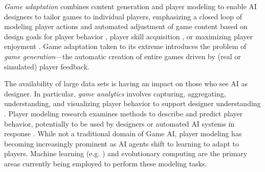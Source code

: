 \documentclass[conference]{IEEEtran}
\begin{document}
{\em Game adaptation} combines content generation and player modeling to enable AI designers to tailor games to individual players, emphasizing a closed loop of modeling player actions and automated adjustment of game content based on design goals for player behavior \cite{smith2012:refraction}, player skill acquisition \cite{andersen2013:trace}, or maximizing player enjoyment \cite{yu2012:prefix-based, thue2007:storytell-pm, shaker2010:platformer-gen}.
%
Game adaptation taken to its extreme introduces the problem of {\em game generation}---the automatic creation of entire games driven by (real or simulated) player feedback.

The availability of large data sets is having an impact on those who see AI as designer.
In particular, {\em game analytics} involves capturing, aggregating, understanding, and visualizing player behavior to support designer understanding \cite{seifel-nasr2013:game-analytics-book}. 
Player modeling research examines methods to describe and predict player behavior, potentially to be used by designers or automated AI systems in response \cite{smith2011:playermodel}. 
While not a traditional domain of Game AI, player modeling has becoming increasingly prominent as AI agents shift to learning to adapt to players. 
Machine learning (e.g. \cite{harrison2011:wow-seq-pred, weber2011:playermodel}) and evolutionary computing \cite{yannakakis2011:edpcg} are the primary areas currently being employed to perform these modeling tasks. %

\end{document}
